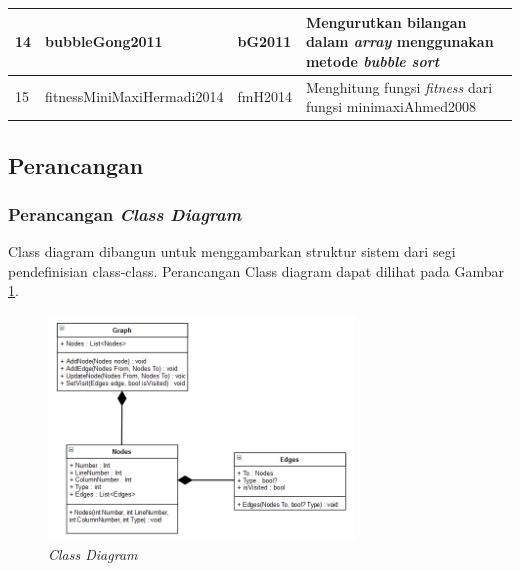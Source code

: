 \begin{table}[h!]
\begin{center}
\begin{tabular}{|l|l|l|p{9cm}|}
 				14                                                        & bubbleGong2011                                                    & bG2011                                                     & Mengurutkan bilangan dalam \textit{array} menggunakan metode \textit{bubble sort   }                                                    \\ \hline
 				15                                                        & fitnessMiniMaxiHermadi2014                                        & fmH2014                                                    & Menghitung fungsi \textit{fitness } dari fungsi minimaxiAhmed2008                                                               \\ \hline
 			\end{tabular}
 		\normalsize
 	\end{center}
 \end{table}

\subsection*{Perancangan}

\subsubsection*{Perancangan \textit{Class Diagram}}
Class diagram dibangun untuk menggambarkan struktur sistem dari segi pendefinisian class-class. Perancangan Class diagram dapat dilihat pada Gambar \ref{fig:classdiagram}.
\begin{figure}[h!]
	\centering
	\includegraphics[width=230pt]{gambar/classdiagram}
	\caption{\textit{Class Diagram}}
	\label{fig:classdiagram}
\end{figure}
